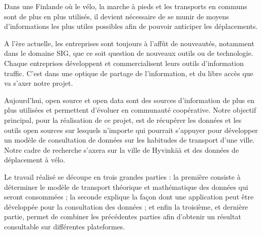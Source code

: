 
Dans une Finlande où le vélo, la marche à pieds et les transports en communs sont de plus en plus utilisés, il devient nécessaire de se munir de moyens d'informations les plus utiles possibles afin de pouvoir anticiper les déplacements.

A l’ère actuelle, les entreprises sont toujours à l’affût de nouveautés, notamment dans le domaine SIG, que ce soit question de nouveaux outils ou de technologie. Chaque entreprises développent et commercialisent leurs outils d'information traffic. C'est dans une optique de partage de l'information, et du libre accès que va s'axer notre projet.

Aujourd'hui, open source et open data sont des sources d'information de plus en plus utilisées et permettent d'évoluer en communauté coopérative. Notre objectif principal, pour la réalisation de ce projet, est de récupérer les données et les outils open sources sur lesquels n'importe qui pourrait s'appuyer pour développer un modèle de consultation de données sur les habitudes de transport d'une ville. Notre cadre de recherche s'axera sur la ville de Hyvinkää et des données de déplacement à vélo.

Le travail réalisé se découpe en trois grandes parties : la première consiste à déterminer le modèle de transport théorique et mathématique des données qui seront consommées ; la seconde explique la façon dont une application peut être développée pour la consultation des données ; et enfin la troisième, et dernière partie, permet de combiner les précédentes parties afin d'obtenir un résultat consultable sur différentes plateformes.
